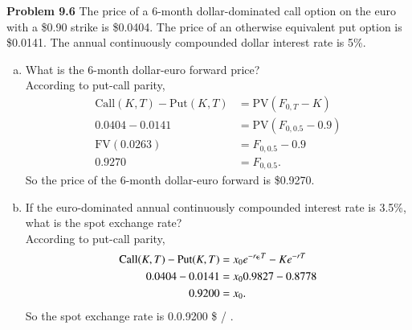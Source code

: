 \documentclass[12pt]{article}
\newcommand{\problem}[1]{\bigskip \noindent \textbf{Problem #1}}
\newcommand{\Call}{\text{Call}}
\newcommand{\Put}{\text{Put}}
\newcommand{\PV}{\text{PV}}
\newcommand{\FV}{\text{FV}}
\newcommand{\euro}{\text{\texteuro}}
\theoremstyle{plain}
\begin{document}
\problem{9.6} The price of a 6-month dollar-dominated call option on the euro with a \$0.90 strike is \$0.0404. The price of an otherwise equivalent put option is \$0.0141. The annual continuously compounded dollar interest rate is 5\%.
\begin{enumerate}[(a)]
\item What is the 6-month dollar-euro forward price?\\

According to put-call parity,
\begin{align*}
\Call(K,T) - \Put(K,T) &= \PV(F_{0,T} - K)\\
0.0404 - 0.0141 &= \PV(F_{0,0.5} - 0.9)\\
\FV(0.0263) &= F_{0,0.5} - 0.9\\
0.9270 &= F_{0,0.5}.
\end{align*}
So the price of the 6-month dollar-euro forward is \$0.9270.

\item If the euro-dominated annual continuously compounded interest rate is 3.5\%, what is the spot exchange rate?\\

According to put-call parity,
\begin{align*}
\Call(K,T) - \Put(K,T) &= x_0e^{-r_{\euro}T} - Ke^{-rT}\\
0.0404 - 0.0141 &= x_0 0.9827 - 0.8778\\
0.9200 &= x_0.
\end{align*}
So the spot exchange rate is 0.0.9200 \$ / \texteuro.
\end{enumerate}
\end{document}
